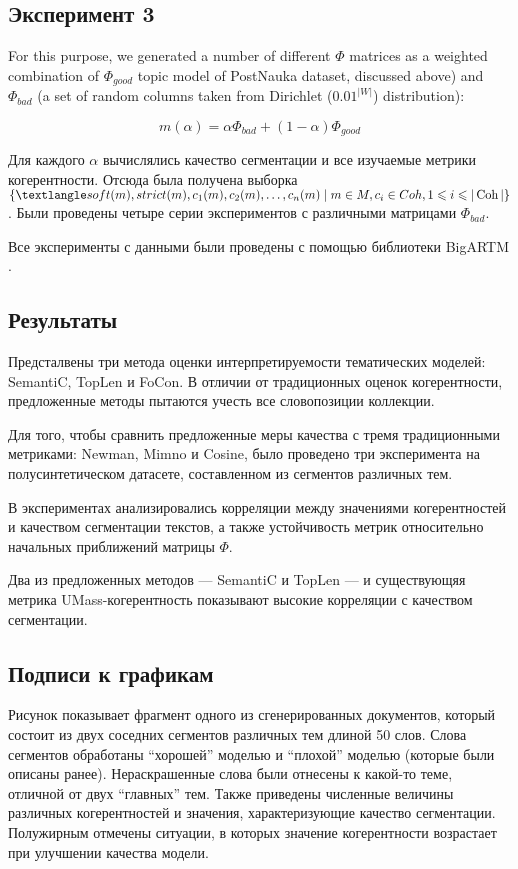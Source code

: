   \subsection{Эксперимент 3}

For this purpose, we generated a number of different $\Phi$ matrices as a weighted
combination of $\Phi_{good}$ topic model of PostNauka dataset, discussed above) and $\Phi_{bad}$
(a set of random columns taken from Dirichlet ($0.01^{|W|}$) distribution):

\[
m(\alpha) = \alpha \Phi_{bad} + (1-\alpha)\Phi_{good}
\]

Для каждого $\alpha$ вычислялись качество сегментации и все изучаемые метрики когерентности. Отсюда была получена выборка $\{⟨soft(m), strict(m), c_1(m), c_2(m), \dots, c_n(m) \mid m \in M, c_i
\in Coh, 1 \leq i \leq |\Coh|\}$. Были проведены четыре серии экспериментов с различными матрицами $\Phi_{bad}$.

Все эксперименты с данными были проведены с помощью библиотеки BigARTM
  \cite{vokov2015}.
 
\subsection{Результаты}
Предсталвены три метода оценки интерпретируемости тематических моделей: SemantiC, TopLen
и FoCon. В отличии от традиционных оценок когерентности, предложенные методы пытаются учесть все словопозиции коллекции.

Для того, чтобы сравнить предложенные меры качества с тремя традиционными метриками:  Newman, Mimno и Cosine, было проведено три эксперимента на полусинтетическом датасете, составленном из сегментов различных тем. 

В экспериментах анализировались корреляции между значениями когерентностей и качеством сегментации текстов, а также устойчивость метрик относительно начальных приближений матрицы $\Phi$.

Два из предложенных методов --- SemantiC и TopLen --- и существующяя метрика UMass-когерентность показывают высокие корреляции с качеством сегментации. 

\subsection{Подписи к графикам}
Рисунок показывает фрагмент одного из сгенерированных документов, который состоит из двух соседних сегментов различных тем длиной 50 слов. Слова сегментов обработаны ``хорошей'' моделью и ``плохой'' моделью (которые были описаны ранее). Нераскрашенные слова были отнесены к какой-то теме, отличной от двух ``главных'' тем. Также приведены численные величины различных когерентностей и значения, характеризующие качество сегментации. Полужирным отмечены ситуации, в которых значение когерентности возрастает при улучшении качества модели.

